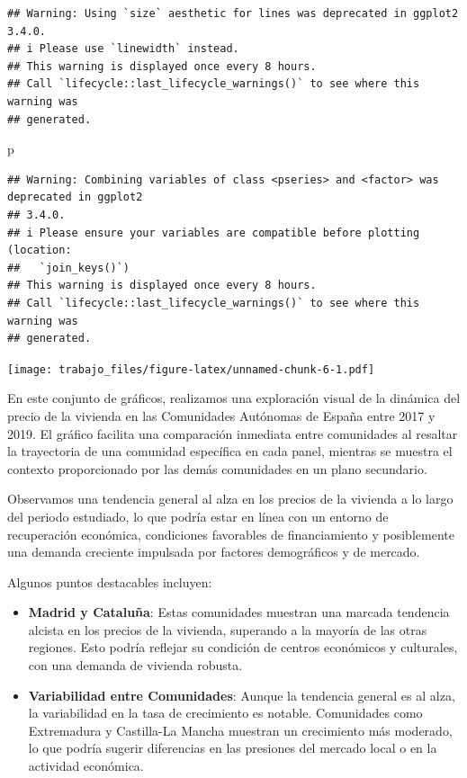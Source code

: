 \documentclass[
]{article}
\newenvironment{Shaded}{\begin{snugshade}}{\end{snugshade}}
\newcommand{\NormalTok}[1]{#1}
\begin{document}
\begin{verbatim}
## Warning: Using `size` aesthetic for lines was deprecated in ggplot2 3.4.0.
## i Please use `linewidth` instead.
## This warning is displayed once every 8 hours.
## Call `lifecycle::last_lifecycle_warnings()` to see where this warning was
## generated.
\end{verbatim}

\begin{Shaded}
\begin{Highlighting}[]
\NormalTok{p}
\end{Highlighting}
\end{Shaded}

\begin{verbatim}
## Warning: Combining variables of class <pseries> and <factor> was deprecated in ggplot2
## 3.4.0.
## i Please ensure your variables are compatible before plotting (location:
##   `join_keys()`)
## This warning is displayed once every 8 hours.
## Call `lifecycle::last_lifecycle_warnings()` to see where this warning was
## generated.
\end{verbatim}

\texttt{[image: trabajo\_files/figure-latex/unnamed-chunk-6-1.pdf]}

En este conjunto de gráficos, realizamos una exploración visual de la
dinámica del precio de la vivienda en las Comunidades Autónomas de
España entre 2017 y 2019. El gráfico facilita una comparación inmediata
entre comunidades al resaltar la trayectoria de una comunidad específica
en cada panel, mientras se muestra el contexto proporcionado por las
demás comunidades en un plano secundario.

Observamos una tendencia general al alza en los precios de la vivienda a
lo largo del periodo estudiado, lo que podría estar en línea con un
entorno de recuperación económica, condiciones favorables de
financiamiento y posiblemente una demanda creciente impulsada por
factores demográficos y de mercado.

Algunos puntos destacables incluyen:

\begin{itemize}
\item
  \textbf{Madrid y Cataluña}: Estas comunidades muestran una marcada
  tendencia alcista en los precios de la vivienda, superando a la
  mayoría de las otras regiones. Esto podría reflejar su condición de
  centros económicos y culturales, con una demanda de vivienda robusta.
\item
  \textbf{Variabilidad entre Comunidades}: Aunque la tendencia general
  es al alza, la variabilidad en la tasa de crecimiento es notable.
  Comunidades como Extremadura y Castilla-La Mancha muestran un
  crecimiento más moderado, lo que podría sugerir diferencias en las
  presiones del mercado local o en la actividad económica.
\end{itemize}
\end{document}
